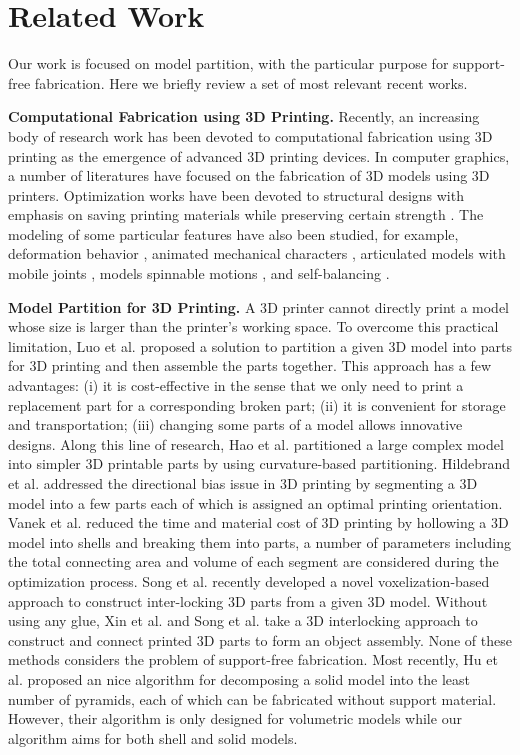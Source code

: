 \section{Related Work}

Our work is focused on model partition, with the particular purpose for support-free fabrication. Here we briefly review a set of most relevant recent works.

\textbf{Computational Fabrication using 3{D} Printing.} Recently, an increasing body of research work has been devoted to computational fabrication using 3{D} printing as the emergence of advanced 3{D} printing devices. In computer graphics, a number of literatures have focused on the fabrication of 3{D} models using 3{D} printers. Optimization works have been devoted to structural designs with emphasis on saving printing materials while preserving certain strength \cite{StavaVBCM12,ZhouPZ13,WangWYLTTDCL13,Umetani:2013:CSA,LuSZWFCSTCC14}. The modeling of some particular features have also been studied, for example, deformation behavior \cite{SkourasTCBG13}, animated mechanical characters \cite{CorosTNSFSMB13,CeylanLMAP13}, articulated models with mobile joints \cite{BacherBJP12,CaliCAKSKW12}, models spinnable motions \cite{Bacher14}, and self-balancing \cite{PrevostWLS13}.


\textbf{Model Partition for 3{D} Printing.} A 3{D} printer cannot directly print a model whose size is larger than the printer's working space. To overcome this practical limitation, Luo et al. \cite{LuoBRM12} proposed a solution to partition a given 3D model into parts for 3D printing and then assemble the parts together. This approach has a few advantages: (i) it is cost-effective in the sense that we only need to print a replacement part for a corresponding broken part; (ii) it is convenient for storage and transportation; (iii) changing some parts of a model allows innovative designs. Along this line of research, Hao et al. \cite{hao2011efficient} partitioned a large complex model into simpler 3D printable parts by using curvature-based partitioning. Hildebrand et al. \cite{HildebrandBA13} addressed the directional bias issue in 3D printing by segmenting a 3D model into a few parts each of which is assigned an optimal printing orientation. Vanek et al. \cite{VanekGBMCSM14} reduced the time and material cost of 3D printing by hollowing a 3D model into shells and breaking them into parts, a number of parameters including the total connecting area and volume of each segment are considered during the optimization process. Song et al. \cite{SongFLF15} recently developed a novel voxelization-based approach to construct inter-locking 3D parts from a given 3D model. Without using any glue, Xin et al. \cite{XinLFWHC11} and Song et al. \cite{SongFC12} take a 3D interlocking approach to construct and connect printed 3D parts to form an object assembly. None of these methods considers the problem of support-free fabrication. Most recently, Hu et al. \cite{Hu_siga14} proposed an nice algorithm for decomposing a solid model into the least number of pyramids, each of which can be fabricated without support material. However, their algorithm is only designed for volumetric models while our algorithm aims for both shell and solid models.


